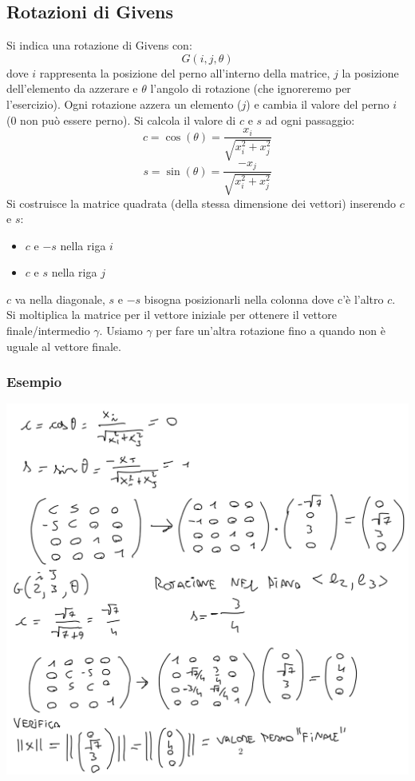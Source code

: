 \documentclass[10pt]{article}
\begin{document}
\subsection{Rotazioni di Givens}
Si indica una rotazione di Givens con:
\begin{equation*}
    G(i,j,\theta)
\end{equation*}
dove $i$ rappresenta la posizione del perno all'interno della matrice, $j$ la posizione dell'elemento da azzerare e $\theta$ l'angolo di rotazione (che ignoreremo per l'esercizio). Ogni rotazione azzera un elemento ($j$) e cambia il valore del perno $i$ (0 non può essere perno). Si calcola il valore di $c$ e $s$ ad ogni passaggio:
\begin{equation*}
    c = \cos(\theta)=\frac{x_{i}}{\sqrt{x_{i}^{2}+x_{j}^{2}}}
\end{equation*}
\begin{equation*}
    s = \sin(\theta)=\frac{-x_{j}}{\sqrt{x_{i}^{2}+x_{j}^{2}}}
\end{equation*}
Si costruisce la matrice quadrata (della stessa dimensione dei vettori) inserendo $c$ e $s$:
\begin{itemize}
    \item $c$ e $-s$ nella riga $i$
    \item $c$ e $s$ nella riga $j$ 
\end{itemize}
$c$ va nella diagonale, $s$ e $-s$ bisogna posizionarli nella colonna dove c'è l'altro $c$.\\
Si moltiplica la matrice per il vettore iniziale per ottenere il vettore finale/intermedio $\gamma$. Usiamo $\gamma$ per fare un'altra rotazione fino a quando non è uguale al vettore finale.\\
\subsubsection*{Esempio}
\begin{center}
    \includegraphics[scale=0.3]{givens.png}
\end{center}
\end{document}
